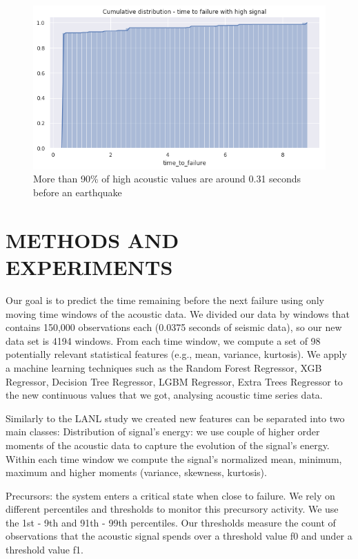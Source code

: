 \documentclass[]{llncs}
\begin{document}
\begin{figure}
	\centering
	\includegraphics[width=0.7\linewidth]{../GPUProject/moreThan90percent}
	\caption{More than 90\% of high acoustic values are around 0.31 seconds before an earthquake}
		\label{fig:morethan90percent}
	\end{figure}






\section{METHODS AND EXPERIMENTS}
Our goal is to predict the time remaining before the next failure using only moving time windows of the acoustic data. We divided our data by windows that contains 150,000 observations each (0.0375 seconds of seismic data), so our new data set is 4194 windows. From each time window, we compute a set of 98 potentially relevant statistical features (e.g., mean, variance, kurtosis). 
We apply a machine learning techniques such as the Random Forest Regressor, XGB Regressor,  Decision Tree Regressor, LGBM Regressor, Extra Trees Regressor to the new continuous values that we got, analysing acoustic time series data.\par
Similarly to the LANL study we created new features can be separated into two main classes: 
Distribution of signal’s energy: we use couple of higher order moments of the acoustic data to capture the evolution of the signal’s energy. Within each time window we compute the signal’s normalized mean, minimum, maximum and higher moments  (variance, skewness, kurtosis).\par
Precursors: the system enters a critical state when close to failure. We rely on different percentiles and thresholds to monitor this precursory activity. We use the 1st - 9th and 91th - 99th percentiles. Our thresholds measure the count of observations that the acoustic signal spends over a threshold value f0 and under a threshold value f1.
\end{document}
